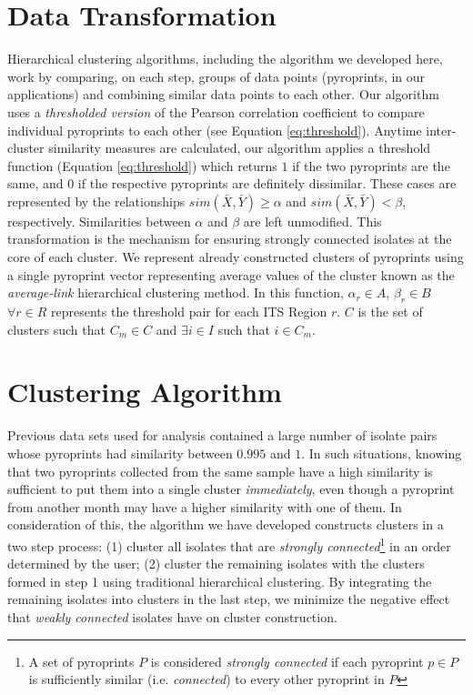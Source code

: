 \documentclass[12pt]{ucthesis}
\begin{document}
   \section{Data Transformation}
      Hierarchical clustering algorithms, including the
      algorithm we developed here, work by comparing, on each step, groups of data
      points (pyroprints, in our applications) and combining similar data points to
      each other. Our algorithm uses a \textit{thresholded version} of the Pearson
      correlation coefficient to compare individual pyroprints to each other (see
      Equation \ref{eq:threshold}). Anytime inter-cluster similarity measures are
      calculated, our algorithm applies a threshold function (Equation
      \ref{eq:threshold}) which returns $1$ if the two pyroprints are the same, and
      $0$ if the respective pyroprints are definitely dissimilar. These cases are
      represented by the relationships $sim(\bar{X}, \bar{Y}) \ge \alpha$ and
      $sim(\bar{X}, \bar{Y}) < \beta$, respectively. Similarities between $\alpha$ and
      $\beta$ are left unmodified. This transformation is the mechanism for ensuring
      strongly connected isolates at the core of each cluster. We represent already
      constructed clusters of pyroprints using a single pyroprint vector representing
      average values of the cluster known as the \textit{average-link} hierarchical
      clustering method. In this function, $\alpha_r \in
      A$, $\beta_r \in B$ $\forall r \in R$ represents the threshold pair for each
      ITS Region $r$. $C$ is the set of clusters such that $C_m \in C$ and $\exists i
      \in I$ such that $i \in C_m$.

   \section{Clustering Algorithm}
      Previous data sets used for analysis contained a
      large number of isolate pairs whose pyroprints had similarity between $0.995$
      and $1$. In such situations, knowing that two pyroprints collected from the
      same sample have a high similarity is sufficient to put them into a single
      cluster \textit{immediately}, even though a pyroprint from another month may
      have a higher similarity with one of them. In consideration of this, the
      algorithm we have developed constructs clusters in a two step process: (1)
      cluster all isolates that are \textit{strongly connected}\footnote{A set of
      pyroprints $P$ is considered \textit{strongly connected} if each pyroprint $p
      \in P$ is sufficiently similar (i.e. \textit{connected}) to every other
      pyroprint in $P$} in an order determined by the user; (2) cluster the remaining
      isolates with the clusters formed in step 1 using traditional hierarchical
      clustering. By integrating the remaining isolates into clusters in the last
      step, we minimize the negative effect that \textit{weakly connected} isolates
      have on cluster construction.
\end{document}
